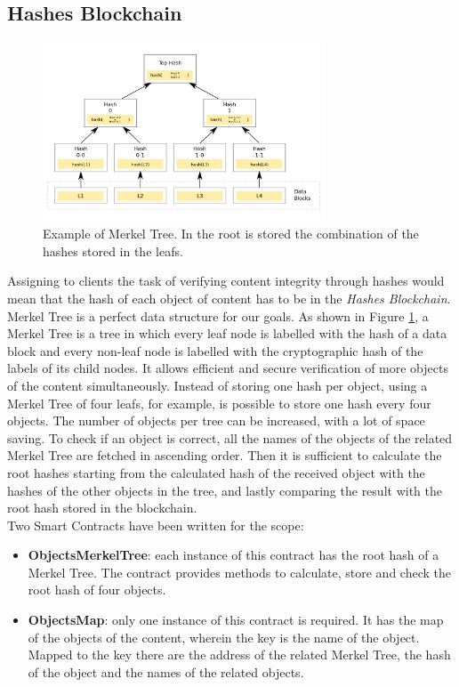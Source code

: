 \documentclass[conference,compsoc]{IEEEtran}
\begin{document}
\subsection{Hashes Blockchain}
\label{clienthashes}
\begin{figure}[!h]
	\centering
	\includegraphics[width=3.3in]{images/merkeltree.png}
	
	\caption{Example of Merkel Tree. In the root is stored the combination of the hashes stored in the leafs.}
	\label{fig:tree}
\end{figure} 
Assigning to clients the task of verifying content integrity through hashes would mean that the hash of each object of content has to be in the \textit{Hashes Blockchain}. Merkel Tree is a perfect data structure for our goals. As shown in Figure \ref{fig:tree}, a Merkel Tree is a tree in which every leaf node is labelled with the hash of a data block and every non-leaf node is labelled with the cryptographic hash of the labels of its child nodes. It allows efficient and secure verification of more objects of the content simultaneously. Instead of storing one hash per object, using a Merkel Tree of four leafs, for example, is possible to store one hash every four objects. The number of objects per tree can be increased, with a lot of space saving. To check if an object is correct, all the names of the objects of the related Merkel Tree are fetched in ascending order. Then it is sufficient to calculate the root hashes starting from the calculated hash of the received object with the hashes of the other objects in the tree, and lastly comparing the result with the root hash stored in the blockchain.\\
Two Smart Contracts have been written for the scope:
\begin{itemize}
	\item \textbf{ObjectsMerkelTree}: each instance of this contract has the root hash of a Merkel Tree. The contract provides methods to calculate, store and check the root hash of four objects.
	\item \textbf{ObjectsMap}: only one instance of this contract is required. It has the map of the objects of the content, wherein the key is the name of the object. Mapped to the key there are the address of the related Merkel Tree, the hash of the object and the names of the related objects. 
\end{itemize}
\end{document}
